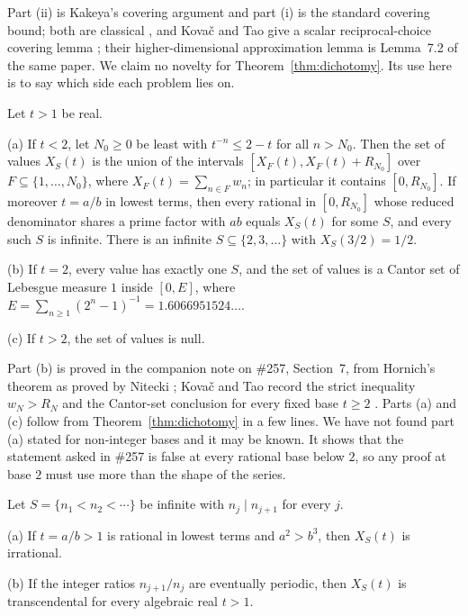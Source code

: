 \documentclass[11pt]{article}
\begin{document}
Part (ii) is Kakeya's covering argument and part (i) is the standard covering
bound; both are classical \cite{hornich1941,nitecki2013,fridy1966}, and
Kova\v{c} and Tao give a scalar reciprocal-choice covering lemma
\cite[Lemma~5.1]{kovactao2024}; their higher-dimensional approximation lemma is
Lemma~7.2 of the same paper.  We claim no novelty for
Theorem~\ref{thm:dichotomy}.  Its use here is to say which side each problem
lies on.

\begin{theorem}\label{thm:bases}
Let $t>1$ be real.

\textup{(a)} If $t<2$, let $N_0\ge0$ be least with $t^{-n}\le2-t$ for all
$n>N_0$.  Then the set of values $X_S(t)$ is the union of the intervals
$[X_F(t),X_F(t)+R_{N_0}]$ over $F\subseteq\{1,\dots,N_0\}$, where
$X_F(t)=\sum_{n\in F}w_n$; in particular it contains $[0,R_{N_0}]$.  If moreover
$t=a/b$ in lowest terms, then every rational in $[0,R_{N_0}]$ whose reduced
denominator shares a prime factor with $ab$ equals $X_S(t)$ for some $S$, and
every such $S$ is infinite.  There is an infinite $S\subseteq\{2,3,\dots\}$
with $X_S(3/2)=1/2$.

\textup{(b)} If $t=2$, every value has exactly one $S$, and the set of values
is a Cantor set of Lebesgue measure $1$ inside $[0,E]$, where
$E=\sum_{n\ge1}(2^n-1)^{-1}=1.6066951524\ldots$.

\textup{(c)} If $t>2$, the set of values is null.
\end{theorem}

Part (b) is proved in the companion note on \#257, Section~7, from Hornich's
theorem as proved by Nitecki \cite{plectis257,hornich1941,nitecki2013}; Kova\v{c}
and Tao record the strict inequality $w_N>R_N$ and the Cantor-set conclusion for
every fixed base $t\ge2$ \cite[Remark~4.1]{kovactao2024}.  Parts (a) and (c) follow
from Theorem~\ref{thm:dichotomy} in a few lines.  We have not found part (a)
stated for non-integer bases and it may be known.  It shows that the statement
asked in \#257 is false at every rational base below $2$, so any proof at base
$2$ must use more than the shape of the series.

\begin{theorem}\label{thm:chains}
Let $S=\{n_1<n_2<\cdots\}$ be infinite with
$n_j\mid n_{j+1}$ for every $j$.

\textup{(a)} If $t=a/b>1$ is rational in lowest terms and $a^2>b^3$, then
$X_S(t)$ is irrational.

\textup{(b)} If the integer ratios $n_{j+1}/n_j$ are eventually periodic,
then $X_S(t)$ is transcendental for every algebraic real $t>1$.
\end{theorem}
\end{document}

